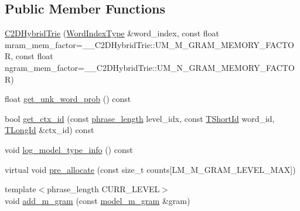 \subsection*{Public Member Functions}
\begin{DoxyCompactItemize}
\item 
\hyperlink{classuva_1_1smt_1_1bpbd_1_1server_1_1lm_1_1_c2_d_hybrid_trie_a3c75a586203214fdd0044a6225cfcec7}{C2\+D\+Hybrid\+Trie} (\hyperlink{classuva_1_1smt_1_1bpbd_1_1server_1_1lm_1_1_word_index_trie_base_a77ee32bf3a9f8a89558bda4f2031200c}{Word\+Index\+Type} \&word\+\_\+index, const float mram\+\_\+mem\+\_\+factor=\+\_\+\+\_\+\+C2\+D\+Hybrid\+Trie\+::\+U\+M\+\_\+\+M\+\_\+\+G\+R\+A\+M\+\_\+\+M\+E\+M\+O\+R\+Y\+\_\+\+F\+A\+C\+T\+O\+R, const float ngram\+\_\+mem\+\_\+factor=\+\_\+\+\_\+\+C2\+D\+Hybrid\+Trie\+::\+U\+M\+\_\+\+N\+\_\+\+G\+R\+A\+M\+\_\+\+M\+E\+M\+O\+R\+Y\+\_\+\+F\+A\+C\+T\+O\+R)
\item 
float \hyperlink{classuva_1_1smt_1_1bpbd_1_1server_1_1lm_1_1_c2_d_hybrid_trie_a0da9801a3e74effa106f8f0903a075c4}{get\+\_\+unk\+\_\+word\+\_\+prob} () const 
\item 
bool \hyperlink{classuva_1_1smt_1_1bpbd_1_1server_1_1lm_1_1_c2_d_hybrid_trie_a20c35c7c115325cacb72e9879b92c938}{get\+\_\+ctx\+\_\+id} (const \hyperlink{namespaceuva_1_1smt_1_1bpbd_1_1server_af068a19c2e03116caf3e3827a3e40e35}{phrase\+\_\+length} level\+\_\+idx, const \hyperlink{namespaceuva_1_1smt_1_1bpbd_1_1server_1_1lm_1_1identifiers_a33043a191e9a637dea742a89d23c8bdc}{T\+Short\+Id} word\+\_\+id, \hyperlink{namespaceuva_1_1smt_1_1bpbd_1_1server_1_1lm_1_1identifiers_a6841847096e455ad3c38689bc548b3b0}{T\+Long\+Id} \&ctx\+\_\+id) const 
\item 
void \hyperlink{classuva_1_1smt_1_1bpbd_1_1server_1_1lm_1_1_c2_d_hybrid_trie_a4c132cfd945b57a6b79a42096da575fb}{log\+\_\+model\+\_\+type\+\_\+info} () const 
\item 
virtual void \hyperlink{classuva_1_1smt_1_1bpbd_1_1server_1_1lm_1_1_c2_d_hybrid_trie_a756edbba028dc11e9101bc60d361bf40}{pre\+\_\+allocate} (const size\+\_\+t counts\mbox{[}L\+M\+\_\+\+M\+\_\+\+G\+R\+A\+M\+\_\+\+L\+E\+V\+E\+L\+\_\+\+M\+A\+X\mbox{]})
\item 
{\footnotesize template$<$phrase\+\_\+length C\+U\+R\+R\+\_\+\+L\+E\+V\+E\+L$>$ }\\void \hyperlink{classuva_1_1smt_1_1bpbd_1_1server_1_1lm_1_1_c2_d_hybrid_trie_a31eeaba36b34431e5bb564950d6485bd}{add\+\_\+m\+\_\+gram} (const \hyperlink{classuva_1_1smt_1_1bpbd_1_1server_1_1lm_1_1m__grams_1_1model__m__gram}{model\+\_\+m\+\_\+gram} \&gram)

\end{DoxyCompactItemize}
